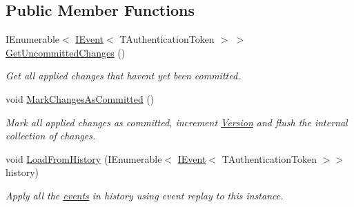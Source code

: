 \subsection*{Public Member Functions}
\begin{DoxyCompactItemize}
\item 
I\+Enumerable$<$ \hyperlink{interfaceCqrs_1_1Events_1_1IEvent}{I\+Event}$<$ T\+Authentication\+Token $>$ $>$ \hyperlink{interfaceCqrs_1_1Domain_1_1IAggregateRoot_a22fda414613f5ac0d4371554d7d6473b_a22fda414613f5ac0d4371554d7d6473b}{Get\+Uncommitted\+Changes} ()
\begin{DoxyCompactList}\small\item\em Get all applied changes that haven\textquotesingle{}t yet been committed. \end{DoxyCompactList}\item 
void \hyperlink{interfaceCqrs_1_1Domain_1_1IAggregateRoot_af31116870bbf6566b3eec0b8bc02c6de_af31116870bbf6566b3eec0b8bc02c6de}{Mark\+Changes\+As\+Committed} ()
\begin{DoxyCompactList}\small\item\em Mark all applied changes as committed, increment \hyperlink{interfaceCqrs_1_1Domain_1_1IAggregateRoot_ad81adab68c0984330f735a1f5a661aa7_ad81adab68c0984330f735a1f5a661aa7}{Version} and flush the internal collection of changes. \end{DoxyCompactList}\item 
void \hyperlink{interfaceCqrs_1_1Domain_1_1IAggregateRoot_afe9329ee26ae68613059189ca64dfe60_afe9329ee26ae68613059189ca64dfe60}{Load\+From\+History} (I\+Enumerable$<$ \hyperlink{interfaceCqrs_1_1Events_1_1IEvent}{I\+Event}$<$ T\+Authentication\+Token $>$$>$ history)
\begin{DoxyCompactList}\small\item\em Apply all the \hyperlink{}{events} in {\itshape history}  using event replay to this instance. \end{DoxyCompactList}\end{DoxyCompactItemize}
